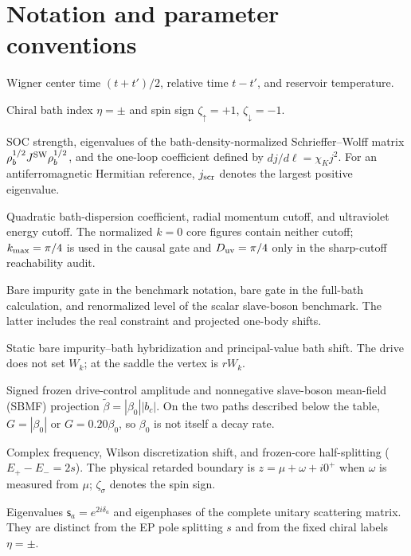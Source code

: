 \documentclass[%
  aps,physrev,onecolumn,10pt,amsmath,amssymb,superscriptaddress,longbibliography,floatfix
]{revtex4-2}
\begin{document}
\section*{Notation and parameter conventions}
\begin{description}[leftmargin=1.6cm,style=nextline]
\item[$t_{\rm av},\tau,T_{\rm b}$]
Wigner center time $(t+t')/2$, relative time $t-t'$, and reservoir temperature.
\item[$\eta,\zeta_\sigma$]
Chiral bath index $\eta=\pm$ and spin sign $\zeta_\uparrow=+1$, $\zeta_\downarrow=-1$.
\item[$\lambda,j_\alpha,\chi_K$]
SOC strength, eigenvalues of the bath-density-normalized Schrieffer--Wolff
matrix $\rho_b^{1/2}J^{\rm SW}\rho_b^{1/2}$, and the one-loop coefficient
defined by $dj/d\ell=\chi_Kj^2$.  For an antiferromagnetic Hermitian
reference, $j_{\rm scr}$ denotes the largest positive eigenvalue.
\item[$\alpha_{\rm b},k_{\rm max},D_{\rm uv}$]
Quadratic bath-dispersion coefficient, radial momentum cutoff, and ultraviolet
energy cutoff.  The normalized $k=0$ core figures contain neither cutoff;
$k_{\rm max}=\pi/4$ is used in the causal gate and
$D_{\rm uv}=\pi/4$ only in the sharp-cutoff reachability audit.
\item[$\epsilon_\xi,\epsilon_d,\tilde\epsilon_\xi$]
Bare impurity gate in the benchmark notation, bare gate in the full-bath
calculation, and renormalized level of the scalar slave-boson benchmark.
The latter includes the real constraint and projected one-body shifts.
\item[$W_k,W,\Lambda_\eta^{\rm PV}$]
Static bare impurity--bath hybridization and principal-value bath shift.
The drive does not set $W_k$; at the saddle the vertex is $rW_k$.
\item[$\beta_0,\tilde\beta$]
Signed frozen drive-control amplitude and nonnegative slave-boson mean-field
(SBMF) projection $\tilde\beta=|\beta_0||b_c|$.  On the two paths described
below the table, $G=|\beta_0|$ or $G=0.20\beta_0$, so $\beta_0$ is not itself
a decay rate.
\item[$z,z_W,s$]
Complex frequency, Wilson discretization shift, and frozen-core half-splitting
($E_+-E_-=2s$).  The physical retarded boundary is
$z=\mu+\omega+i0^+$ when $\omega$ is measured from $\mu$;
$\zeta_\sigma$ denotes the spin sign.
\item[$\mathsf{s}_a,\delta_a$]
Eigenvalues $\mathsf{s}_a=e^{2i\delta_a}$ and eigenphases of the complete
unitary scattering matrix.  They are distinct from the EP pole splitting $s$ and from the fixed chiral labels $\eta=\pm$.

\end{description}
\end{document}
